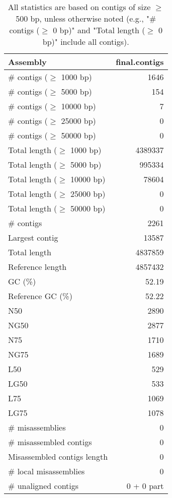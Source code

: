 \documentclass[12pt,a4paper]{article}
\begin{document}
\begin{table}[ht]
\begin{center}
\caption{All statistics are based on contigs of size $\geq$ 500 bp, unless otherwise noted (e.g., "\# contigs ($\geq$ 0 bp)" and "Total length ($\geq$ 0 bp)" include all contigs).}
\begin{tabular}{|l*{1}{|r}|}
\hline
Assembly & final.contigs \\ \hline
\# contigs ($\geq$ 1000 bp) & 1646 \\ \hline
\# contigs ($\geq$ 5000 bp) & 154 \\ \hline
\# contigs ($\geq$ 10000 bp) & 7 \\ \hline
\# contigs ($\geq$ 25000 bp) & 0 \\ \hline
\# contigs ($\geq$ 50000 bp) & 0 \\ \hline
Total length ($\geq$ 1000 bp) & 4389337 \\ \hline
Total length ($\geq$ 5000 bp) & 995334 \\ \hline
Total length ($\geq$ 10000 bp) & 78604 \\ \hline
Total length ($\geq$ 25000 bp) & 0 \\ \hline
Total length ($\geq$ 50000 bp) & 0 \\ \hline
\# contigs & 2261 \\ \hline
Largest contig & 13587 \\ \hline
Total length & 4837859 \\ \hline
Reference length & 4857432 \\ \hline
GC (\%) & 52.19 \\ \hline
Reference GC (\%) & 52.22 \\ \hline
N50 & 2890 \\ \hline
NG50 & 2877 \\ \hline
N75 & 1710 \\ \hline
NG75 & 1689 \\ \hline
L50 & 529 \\ \hline
LG50 & 533 \\ \hline
L75 & 1069 \\ \hline
LG75 & 1078 \\ \hline
\# misassemblies & 0 \\ \hline
\# misassembled contigs & 0 \\ \hline
Misassembled contigs length & 0 \\ \hline
\# local misassemblies & 0 \\ \hline
\# unaligned contigs & 0 + 0 part \\ \hline

\end{tabular}
\end{center}
\end{table}
\end{document}
